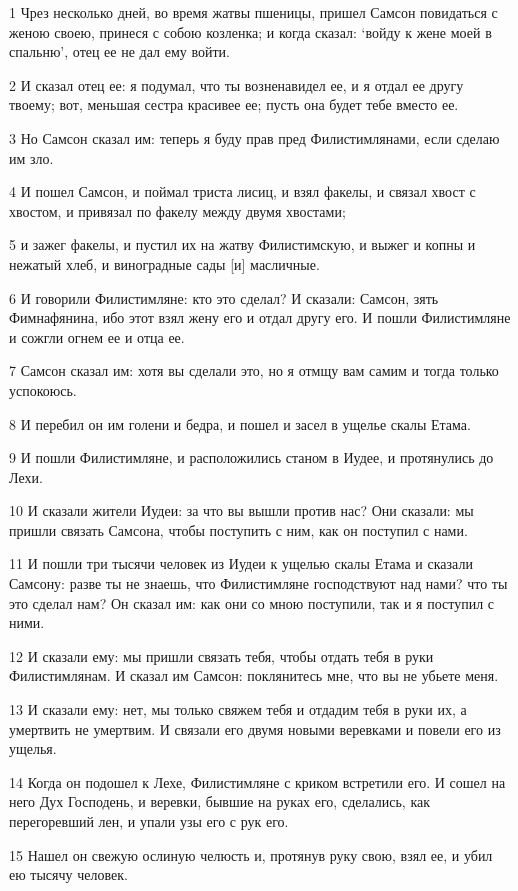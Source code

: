 \par 1 Чрез несколько дней, во время жатвы пшеницы, пришел Самсон повидаться с женою своею, принеся с собою козленка; и когда сказал: `войду к жене моей в спальню', отец ее не дал ему войти.
\par 2 И сказал отец ее: я подумал, что ты возненавидел ее, и я отдал ее другу твоему; вот, меньшая сестра красивее ее; пусть она будет тебе вместо ее.
\par 3 Но Самсон сказал им: теперь я буду прав пред Филистимлянами, если сделаю им зло.
\par 4 И пошел Самсон, и поймал триста лисиц, и взял факелы, и связал хвост с хвостом, и привязал по факелу между двумя хвостами;
\par 5 и зажег факелы, и пустил их на жатву Филистимскую, и выжег и копны и нежатый хлеб, и виноградные сады [и] масличные.
\par 6 И говорили Филистимляне: кто это сделал? И сказали: Самсон, зять Фимнафянина, ибо этот взял жену его и отдал другу его. И пошли Филистимляне и сожгли огнем ее и отца ее.
\par 7 Самсон сказал им: хотя вы сделали это, но я отмщу вам самим и тогда только успокоюсь.
\par 8 И перебил он им голени и бедра, и пошел и засел в ущелье скалы Етама.
\par 9 И пошли Филистимляне, и расположились станом в Иудее, и протянулись до Лехи.
\par 10 И сказали жители Иудеи: за что вы вышли против нас? Они сказали: мы пришли связать Самсона, чтобы поступить с ним, как он поступил с нами.
\par 11 И пошли три тысячи человек из Иудеи к ущелью скалы Етама и сказали Самсону: разве ты не знаешь, что Филистимляне господствуют над нами? что ты это сделал нам? Он сказал им: как они со мною поступили, так и я поступил с ними.
\par 12 И сказали ему: мы пришли связать тебя, чтобы отдать тебя в руки Филистимлянам. И сказал им Самсон: поклянитесь мне, что вы не убьете меня.
\par 13 И сказали ему: нет, мы только свяжем тебя и отдадим тебя в руки их, а умертвить не умертвим. И связали его двумя новыми веревками и повели его из ущелья.
\par 14 Когда он подошел к Лехе, Филистимляне с криком встретили его. И сошел на него Дух Господень, и веревки, бывшие на руках его, сделались, как перегоревший лен, и упали узы его с рук его.
\par 15 Нашел он свежую ослиную челюсть и, протянув руку свою, взял ее, и убил ею тысячу человек.
